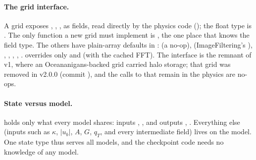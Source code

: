 \paragraph{The grid interface.} A grid exposes , , ,  as fields, read directly by the
physics code (); the float type is . The only function a new grid must implement is
, the one place that knows the field type. The others have plain-array defaults in
:  (a no-op),  (ImageFiltering's ),
, , , ,
.  overrides only  and  (with the cached FFT).
The interface is the remnant of v1, where an Oceananigans-backed grid carried halo storage; that grid was removed in
v2.0.0 (commit ), and the calls to  that remain in the physics are no-ops.

\paragraph{State versus model.}  holds only what every model shares: inputs , , 
and outputs , . Everything else (inputs such as $\kappa$, $|u_b|$, $A$, $G$, $q_T$, and every intermediate
field) lives on the model. One state type thus serves all models, and the checkpoint code needs no knowledge of any
model.

